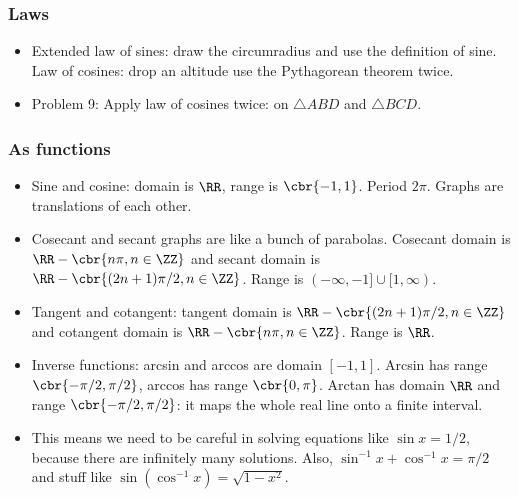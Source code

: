 \documentclass[10pt,paper=letter]{scrartcl}
\begin{document}
\subsubsection*{Laws}

\begin{itemize}
  \item Extended law of sines: draw the circumradius and use the definition of sine. Law of cosines: drop an altitude use the Pythagorean theorem twice.
  \item Problem 9: Apply law of cosines twice: on $\triangle ABD$ and $\triangle BCD$.
\end{itemize}

\subsubsection*{As functions}

\begin{itemize}
  \item Sine and cosine: domain is $\RR$, range is $\cbr{-1, 1}$. Period $2\pi$. Graphs are translations of each other.
  \item Cosecant and secant graphs are like a bunch of parabolas. Cosecant domain is $\RR - \cbr{n\pi, n \in \ZZ}$ and secant domain is $\RR - \cbr{(2n+1)\pi/2, n \in \ZZ}$. Range is $(-\infty, -1] \cup [1, \infty)$.
  \item Tangent and cotangent: tangent domain is $\RR - \cbr{(2n+1)\pi/2, n \in \ZZ}$ and cotangent domain is $\RR - \cbr{n\pi, n \in \ZZ}$. Range is $\RR$.
  \item Inverse functions: arcsin and arccos are domain $[-1, 1]$. Arcsin has range $\cbr{-\pi/2, \pi/2}$, arccos has range $\cbr{0, \pi}$. Arctan has domain $\RR$ and range $\cbr{-\pi/2, \pi/2}$: it maps the whole real line onto a finite interval.
  \item This means we need to be careful in solving equations like $\sin x = 1/2$, because there are infinitely many solutions. Also, $\sin^{-1} x + \cos^{-1} x = \pi/2$ and stuff like $\sin(\cos^{-1} x) = \sqrt{1 - x^2}$.
\end{itemize}

\newpage
\end{document}
